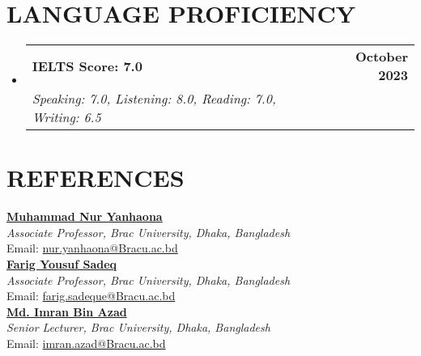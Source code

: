 \documentclass[letterpaper,10.5pt]{article}
\makeatletter
\newcommand{\resumeSubheading}[4]{
  \vspace{-2pt}\item
    \begin{tabular*}{1.0\textwidth}[t]{l@{\extracolsep{\fill}}r}
      \textbf{#1} & \textbf{\small #2} \\
      \textit{\small#3} & \textit{\small #4} \\
    \end{tabular*}\vspace{-7pt}
}
\newcommand{\resumeProjectHeading}[2]{
    \item
    \begin{tabular*}{1.001\textwidth}{l@{\extracolsep{\fill}}r}
      \small#1 & \textbf{\small #2}\\
    \end{tabular*}\vspace{-7pt}
}
\newcommand{\resumeSubHeadingListStart}{\begin{itemize}[leftmargin=0.0in, label={}]}
\newcommand{\resumeSubHeadingListEnd}{\end{itemize}}
\makeatother
\begin{document}
\section{LANGUAGE PROFICIENCY}
\vspace{0pt}
\resumeSubHeadingListStart
\resumeSubheading
{IELTS Score: 7.0}{October 2023}
{Speaking: 7.0, Listening: 8.0, Reading: 7.0, Writing: 6.5}{}
\resumeSubHeadingListEnd
\vspace{-8pt}
\section{REFERENCES}
\vspace{0pt}
\textbf{\href{https://www.scopus.com/authid/detail.uri?authorId=24722142100}{\color{NavyBlue} Muhammad Nur Yanhaona}} \\
\emph{Associate Professor, Brac University, Dhaka, Bangladesh} \\
Email: \href{mailto:nur.yanhaona@Bracu.ac.bd}{\color{NavyBlue}nur.yanhaona@Bracu.ac.bd} \\
\textbf{\href{https://scholar.google.com/citations?user=ULNaeowAAAAJ&hl=en}{\color{NavyBlue} Farig Yousuf Sadeq}} \\
\emph{Associate Professor, Brac University, Dhaka, Bangladesh} \\
Email: \href{mailto:farig.sadeque@Bracu.ac.bd}{\color{NavyBlue}farig.sadeque@Bracu.ac.bd} \\
\textbf{\href{https://codeforces.com/profile/Imran_Bin_Azad}{\color{NavyBlue} Md. Imran Bin Azad}} \\
\emph{Senior Lecturer, Brac University, Dhaka, Bangladesh} \\
Email: \href{mailto:imran.azad@Bracu.ac.bd}{\color{NavyBlue}imran.azad@Bracu.ac.bd} \\
\vspace{-8pt}







\end{document}
